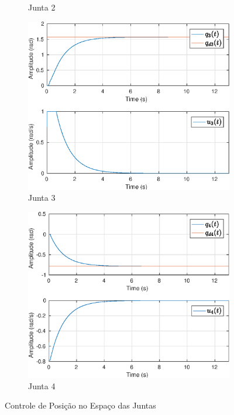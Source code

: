 \begin{figure}[H]
\begin{subfigure}{.5\textwidth}
  \caption{Junta 2}
  \label{fig:sub2}
\end{subfigure}
\begin{subfigure}{.5\textwidth}
  \centering
  \includegraphics[width=\linewidth]{./img/joint_test1/q3.eps}
  \caption{Junta 3}
  \label{fig:sub1}
\end{subfigure}%
\begin{subfigure}{.5\textwidth}
  \centering
  \includegraphics[width=\linewidth]{./img/joint_test1/q4.eps}
  \caption{Junta 4}
  \label{fig:sub2}
\end{subfigure}
\caption{Controle de Posição no Espaço das Juntas}
\label{fig:test}
\end{figure}



